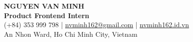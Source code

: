 \begin{center}
    {\fontsize{25}{28}\selectfont\bfseries NGUYEN VAN MINH}\\[4pt]
    {\large\bfseries Product Frontend Intern}\\[6pt]
    \small (+84) 353 999 798 \;|\; \href{mailto:nvminh162@gmail.com}{nvminh162@gmail.com} \;|\; \href{https://nvminh162.id.vn}{nvminh162.id.vn}\\[3pt]
    \small An Nhon Ward, Ho Chi Minh City, Vietnam
    \\ \vspace{-1pt}
\end{center}
